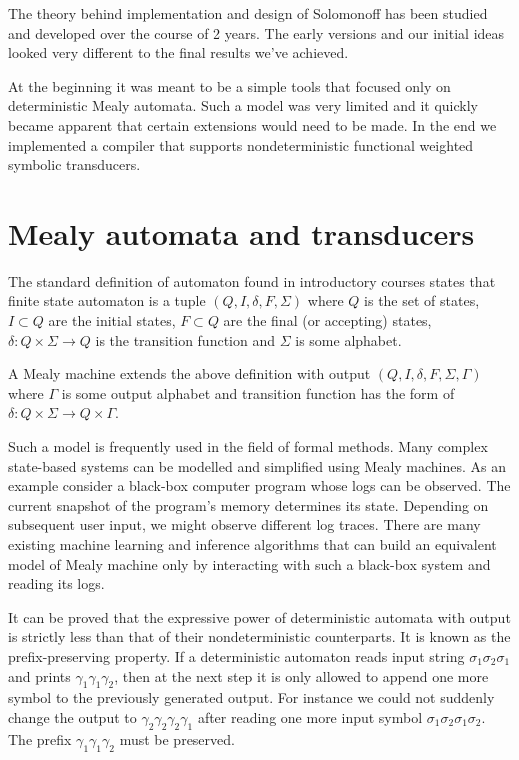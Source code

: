 \documentclass[12pt]{article}
\begin{document}
\maketitle
\lstset{
	basicstyle=\ttfamily,
	mathescape
}


The theory behind implementation and design of Solomonoff has been studied and developed over the course of 2 years. The early versions and our initial ideas looked very different to the final results we've achieved. 

At the beginning it was meant to be a simple tools that focused only on deterministic Mealy automata. Such a model was very limited and it quickly became apparent that certain extensions would need to be made. In the end we implemented a compiler that supports nondeterministic functional weighted symbolic transducers. 

\section{Mealy automata and transducers}

The standard definition of automaton found in introductory courses states that finite state automaton is  a tuple $(Q,I,\delta,F,\Sigma)$ where $Q$ is the set of states, $I \subset Q$ are the initial states,  $F \subset Q$ are the final (or accepting) states, $\delta:Q\times \Sigma \rightarrow Q$ is the transition function and $\Sigma$ is some alphabet. 

A Mealy machine extends the above definition with output  $(Q,I,\delta,F,\Sigma,\Gamma)$ where $\Gamma$ is some output alphabet and transition function has the form of $\delta:Q\times \Sigma \rightarrow Q \times \Gamma$. 

Such a model is frequently used in the field of formal methods. Many complex state-based systems can be modelled and simplified using Mealy machines. As an example consider a black-box computer program whose logs can be observed. The current snapshot of the program's memory determines its state. Depending on subsequent user input, we might observe different log traces. There are many existing machine learning and inference algorithms that can build an equivalent model of Mealy machine only by interacting with such a black-box system and reading its logs. 

It can be proved that the expressive power of deterministic automata with output is strictly less than that of their nondeterministic counterparts. It is known as the prefix-preserving  property. If a deterministic automaton reads input string $\sigma_1\sigma_2\sigma_1$ and prints $\gamma_1\gamma_1\gamma_2$, then at the next step it is only allowed to append one more symbol to the previously generated output. For instance we could not suddenly change the output to $\gamma_2\gamma_2\gamma_2\gamma_1$ after reading one more input symbol $\sigma_1\sigma_2\sigma_1\sigma_2$. The prefix $\gamma_1\gamma_1\gamma_2$ must be preserved. 
\end{document}
